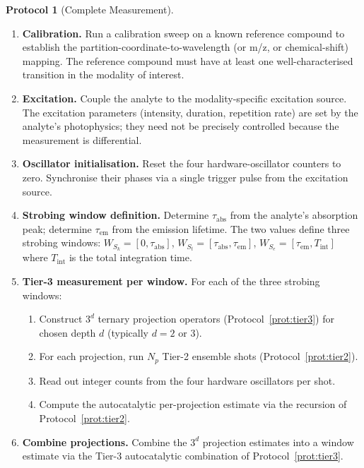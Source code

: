 \documentclass[11pt,a4paper]{article}
\theoremstyle{thmstyle}
\theoremstyle{axiomstyle}
\theoremstyle{definition}
\newtheorem{protocol}[theorem]{Protocol}
\theoremstyle{remark}
\begin{document}
\begin{protocol}[Complete Measurement]\label{prot:complete}
\begin{enumerate}[label=\textbf{Step \arabic*:},leftmargin=*]
\item \textbf{Calibration.} Run a calibration sweep on a known reference compound to establish the partition-coordinate-to-wavelength (or m/z, or chemical-shift) mapping. The reference compound must have at least one well-characterised transition in the modality of interest.

\item \textbf{Excitation.} Couple the analyte to the modality-specific excitation source. The excitation parameters (intensity, duration, repetition rate) are set by the analyte's photophysics; they need not be precisely controlled because the measurement is differential.

\item \textbf{Oscillator initialisation.} Reset the four hardware-oscillator counters to zero. Synchronise their phases via a single trigger pulse from the excitation source.

\item \textbf{Strobing window definition.} Determine $\tau_{\mathrm{abs}}$ from the analyte's absorption peak; determine $\tau_{\mathrm{em}}$ from the emission lifetime. The two values define three strobing windows: $W_{S_{k}}=[0,\tau_{\mathrm{abs}}]$, $W_{S_{t}}=[\tau_{\mathrm{abs}},\tau_{\mathrm{em}}]$, $W_{S_{e}}=[\tau_{\mathrm{em}},T_{\mathrm{int}}]$ where $T_{\mathrm{int}}$ is the total integration time.

\item \textbf{Tier-3 measurement per window.} For each of the three strobing windows:
  \begin{enumerate}[label=(\alph*),nosep]
  \item Construct $3^{d}$ ternary projection operators (Protocol~\ref{prot:tier3}) for chosen depth $d$ (typically $d=2$ or $3$).
  \item For each projection, run $N_{p}$ Tier-2 ensemble shots (Protocol~\ref{prot:tier2}).
  \item Read out integer counts from the four hardware oscillators per shot.
  \item Compute the autocatalytic per-projection estimate via the recursion of Protocol~\ref{prot:tier2}.
  \end{enumerate}

\item \textbf{Combine projections.} Combine the $3^{d}$ projection estimates into a window estimate via the Tier-3 autocatalytic combination of Protocol~\ref{prot:tier3}.


\end{enumerate}
\end{protocol}
\end{document}
